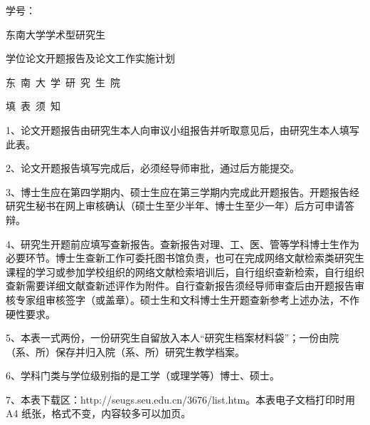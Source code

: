 \clearpage
\thispagestyle{empty}
\vspace*{0.85cm}
\hfill {\songti 学号：\ \underline{\makebox[3.0cm][c]{\StudentID}}}\par
\vspace*{2.15cm}
\begin{center}
  {\fzxiaobiaosong 东南大学学术型研究生\par}
  \vspace{0.75cm}
  {\fzxiaobiaosong 学位论文开题报告及论文工作实施计划\par}
\end{center}
\vspace*{3.45cm}
\begin{center}
  \begin{minipage}{11.2cm}
  \end{minipage}
\end{center}
\vfill
\begin{center}
  { 东\ 南\ 大\ 学\ 研\ 究\ 生\ 院}
\end{center}
\clearpage

\thispagestyle{empty}
\vspace*{3.0cm}
\begin{center}
  {\fzxiaobiaosong 填\ 表\ 须\ 知}
\end{center}
\vspace{1.2cm}
\begingroup
{}
\setlength{\parindent}{2em}

1、论文开题报告由研究生本人向审议小组报告并听取意见后，由研究生本人填写此表。\par
2、论文开题报告填写完成后，必须经导师审批，通过后方能提交。\par
3、博士生应在第四学期内、硕士生应在第三学期内完成此开题报告。开题报告经研究生秘书在网上审核确认（硕士生至少半年、博士生至少一年）后方可申请答辩。\par
4、研究生开题前应填写查新报告。查新报告对理、工、医、管等学科博士生作为必要环节。博士生查新工作可委托图书馆负责，也可在完成网络文献检索类研究生课程的学习或参加学校组织的网络文献检索培训后，自行组织查新检索，自行组织查新需要详细文献查新述评作为附件。自行查新报告须经导师审查后由开题报告审核专家组审核签字（或盖章）。硕士生和文科博士生开题查新参考上述办法，不作硬性要求。\par
5、本表一式两份，一份研究生自留放入本人“研究生档案材料袋”；一份由院（系、所）保存并归入院（系、所）研究生教学档案。\par
6、学科门类与学位级别指的是工学（或理学等）博士、硕士。\par
7、本表下载区：http://seugs.seu.edu.cn/3676/list.htm。本表电子文档打印时用 A4 纸张，格式不变，内容较多可以加页。\par
\endgroup
\clearpage


